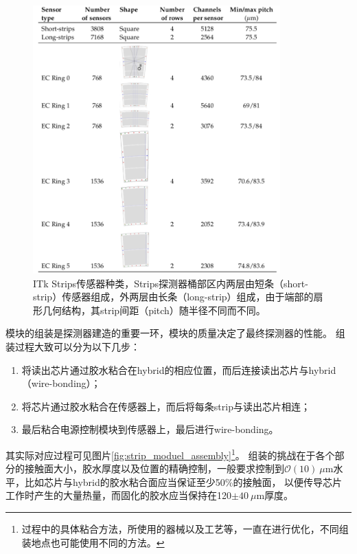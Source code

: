 \begin{figure}[h]
\centering
 \includegraphics[width=0.85\textwidth]{fig/strips_sensor_overview.png}
 \caption{ITk Strips传感器种类\cite{Collaboration:2017mtb}，Strips探测器桶部区内两层由短条（short-strip）传感器组成，外两层由长条（long-strip）组成，由于端部的扇形几何结构，其strip间距（pitch）随半径不同而不同。}
 \label{fig:strip_sensor_overview}
\end{figure}
模块的组装是探测器建造的重要一环，模块的质量决定了最终探测器的性能。
组装过程大致可以分为以下几步：
\begin{enumerate}
 \item 将读出芯片通过胶水粘合在hybrid的相应位置，而后连接读出芯片与hybrid（wire-bonding）；
 \item 将芯片通过胶水粘合在传感器上，而后将每条strip与读出芯片相连；
 \item 最后粘合电源控制模块到传感器上，最后进行wire-bonding。
\end{enumerate}
其实际对应过程可见图片\ref{fig:strip_moduel_assembly}\footnote{过程中的具体粘合方法，所使用的器械以及工艺等，一直在进行优化，不同组装地点也可能使用不同的方法。}。
组装的挑战在于各个部分的接触面大小，胶水厚度以及位置的精确控制，一般要求控制到$\mathcal{O}(10)~\mu\text{m}$水平，比如芯片与hybrid的胶水粘合面应当保证至少50\%的接触面，
以便传导芯片工作时产生的大量热量，而固化的胶水应当保持在120$\pm40~\mu\text{m}$厚度。
